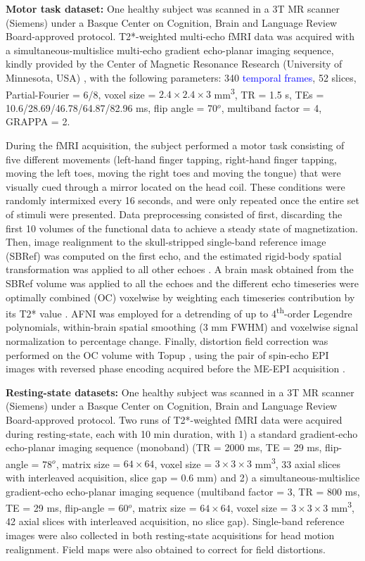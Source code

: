 \textbf{Motor task dataset:} One healthy subject was scanned in a 3T MR scanner
(Siemens) under a Basque Center on Cognition, Brain and Language Review
Board-approved protocol. T2*-weighted multi-echo fMRI data was acquired with a
simultaneous-multislice multi-echo gradient echo-planar imaging sequence, kindly
provided by the Center of Magnetic Resonance Research (University of Minnesota,
USA) \citep{Feinberg_2010,Moeller_2010,Setsompop_2011}, with the following
parameters: 340 \textcolor{blue}{temporal frames}, 52 slices, Partial-Fourier =
6/8, voxel size = $2.4\times2.4\times3$ mm\textsuperscript{3}, TR = 1.5 s, TEs =
10.6/28.69/46.78/64.87/82.96 ms, flip angle = 70\(^o\), multiband factor = 4,
GRAPPA = 2.

During the fMRI acquisition, the subject performed a motor task consisting of
five different movements (left-hand finger tapping, right-hand finger tapping,
moving the left toes, moving the right toes and moving the tongue) that were
visually cued through a mirror located on the head coil. These conditions were
randomly intermixed every 16 seconds, and were only repeated once the entire set
of stimuli were presented. Data preprocessing consisted of first, discarding the
first 10 volumes of the functional data to achieve a steady state of
magnetization. Then, image realignment to the skull-stripped single-band
reference image (SBRef) was computed on the first echo, and the estimated
rigid-body spatial transformation was applied to all other echoes
\citep{Jenkinson2012FSL,Jenkinson_2001}. A brain mask obtained from the SBRef
volume was applied to all the echoes and the different echo timeseries were
optimally combined (OC) voxelwise by weighting each timeseries contribution by
its T2* value \citep{Posse_1999}. AFNI \citep{Cox1996AFNISoftwareAnalysis} was
employed for a detrending of up to 4\textsuperscript{th}-order Legendre
polynomials, within-brain spatial smoothing (3 mm FWHM) and voxelwise signal
normalization to percentage change. Finally, distortion field correction was
performed on the OC volume with Topup \citep{Andersson_2003}, using the pair of
spin-echo EPI images with reversed phase encoding acquired before the ME-EPI
acquisition \citep{Glasser_2016}.

\textbf{Resting-state datasets:} One healthy subject was scanned in a 3T MR
scanner (Siemens) under a Basque Center on Cognition, Brain and Language Review
Board-approved protocol. Two runs of T2*-weighted fMRI data were acquired during
resting-state, each with 10 min duration, with 1) a standard gradient-echo
echo-planar imaging sequence (monoband) (TR = 2000 ms, TE = 29 ms, flip-angle =
78\(^o\), matrix size = $64\times64$, voxel size = $3\times3\times3$
mm\textsuperscript{3}, 33 axial slices with interleaved acquisition, slice gap =
0.6 mm) and 2) a  simultaneous-multislice gradient-echo echo-planar imaging
sequence (multiband factor = 3, TR = 800 ms, TE = 29 ms, flip-angle = 60\(^o\),
matrix size = $64\times64$, voxel size = $3\times3\times3$
mm\textsuperscript{3}, 42 axial slices with interleaved acquisition, no slice
gap). Single-band reference images were also collected in both resting-state
acquisitions for head motion realignment. Field maps were also obtained to
correct for field distortions.

